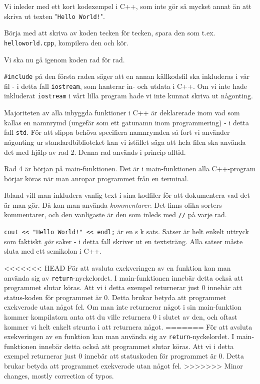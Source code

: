 Vi inleder med ett kort kodexempel i C++, som inte gör så mycket annat än att skriva ut texten "\texttt{Hello World!}".



Börja med att skriva av koden tecken för tecken, spara den som t.ex. \texttt{helloworld.cpp}, kompilera den och kör.

Vi ska nu gå igenom koden rad för rad.

\texttt{\#include} på den första raden säger att en annan källkodsfil ska inkluderas i vår fil - i detta fall \texttt{iostream}, som hanterar in- och utdata i C++. Om vi inte hade inkluderat \texttt{iostream} i vårt lilla program hade vi inte kunnat skriva ut någonting. 

Majoriteten av alla inbyggda funktioner i C++ är deklarerade inom vad som kallas en namnrymd (ungefär som ett gatunamn inom programmering) - i detta fall \texttt{std}. För att slippa behöva specifiera namnrymden så fort vi använder någonting ur standardbiblioteket kan vi istället säga att hela filen ska använda det med hjälp av rad 2. Denna rad används i princip alltid.

Rad 4 är början på main-funktionen. Det är i main-funktionen alla C++-program börjar köras när man anropar programmet från en terminal.

Ibland vill man inkludera vanlig text i sina kodfiler för att dokumentera vad det är man gör. Då kan man använda \emph{kommentarer}. Det finns olika sorters kommentarer, och den vanligaste är den som inleds med \texttt{//} på varje rad.

\texttt{cout << "Hello World!" << endl;} är en s k sats. Satser är helt enkelt uttryck som faktiskt \emph{gör} saker - i detta fall skriver ut en textsträng. Alla satser måste sluta med ett semikolon i C++.

<<<<<<< HEAD
För att avsluta exekveringen av en funktion kan man använda sig av \texttt{return}-nyckelordet. I main-funktionen innebär detta också att programmet slutar köras. Att vi i detta exempel returnerar just 0 innebär att status-koden för programmet är 0. Detta brukar betyda att programmet exekverade utan något fel. Om man inte returnerar något i sin main-funktion kommer kompilatorn anta att du ville returnera 0 i slutet av den, och oftast kommer vi helt enkelt strunta i att returnera något.
=======
För att avsluta exekveringen av en funktion kan man använda sig av \texttt{return}-nyckelordet. I main-funktionen innebär detta också att programmet slutar köras. Att vi i detta exempel returnerar just 0 innebär att statuskoden för programmet är 0. Detta brukar betyda att programmet exekverade utan något fel.
>>>>>>> Minor changes, mostly correction of typos.
